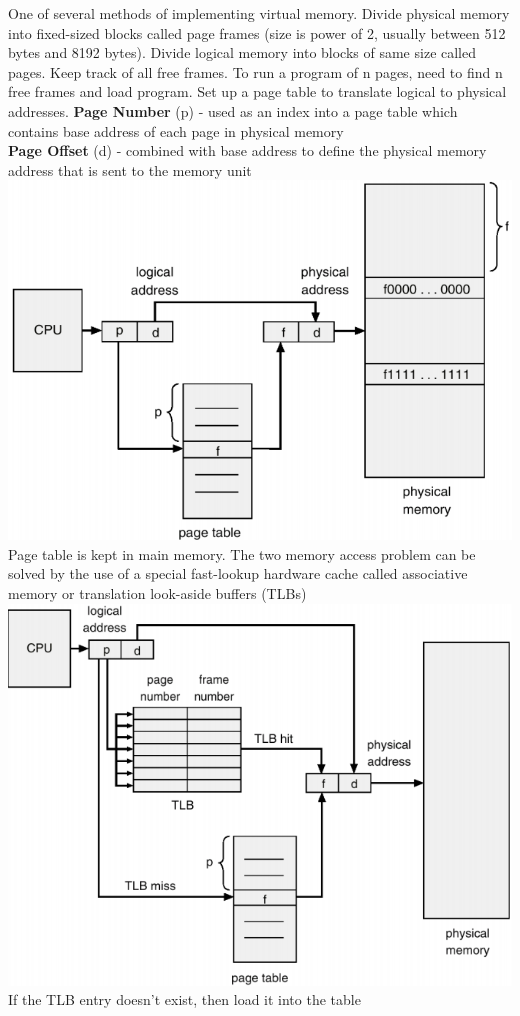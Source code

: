 \documentclass[number]{notes}
\begin{document}
\begin{landscape}
\begin{multicols}{3}
One of several methods of implementing virtual memory. Divide physical memory into fixed-sized blocks called page frames (size is power of 2, usually between 512 bytes and 8192 bytes). Divide logical memory into blocks of same size called pages. Keep track of all free frames. To run a program of n pages, need to find n free frames and load program. Set up a page table to translate logical to physical addresses.
\textbf{Page Number} (p) - used as an index into a page table which contains base address of each page in physical memory\\
\textbf{Page Offset} (d) - combined with base address to define the physical memory address that is sent to the memory unit
\includegraphics[width=0.5\linewidth]{pageTable.png}
Page table is kept in main memory. The two memory access problem can be solved by the use of a special fast-lookup hardware cache called associative memory or translation look-aside buffers (TLBs)
\includegraphics[width=\linewidth]{TLB.png}
If the TLB entry doesn't exist, then load it into the table

\end{multicols}
\end{landscape}
\end{document}
